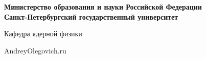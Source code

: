 \begin{titlepage}                                                         
    \newpage                                                                        
    \begin{center}                                                        
    {\bfseries Министерство образования и науки Российской Федерации \\
    Санкт-Петербургский государственный университет}                               
    \vspace{1cm}                                                          
                                                                                        
    Кафедра ядерной физики                                                              
    \vspace{6em}                                                          
                                                                                        
                                                                                        
                                                                                        
                                                                                        
     AndreyOlegovich.ru \\                                                      
    \end{center}                                                          
                                                                                        
    \vspace{1.2em}                                                        
                                                                                        

\end{titlepage}
